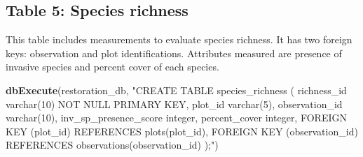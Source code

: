 \documentclass[
]{book}
\newenvironment{Shaded}{\begin{snugshade}}{\end{snugshade}}
\newcommand{\KeywordTok}[1]{\textcolor[rgb]{0.13,0.29,0.53}{\textbf{#1}}}
\newcommand{\NormalTok}[1]{#1}
\newcommand{\StringTok}[1]{\textcolor[rgb]{0.31,0.60,0.02}{#1}}
\begin{document}
\hypertarget{table-5-species-richness}{%
\subsection{Table 5: Species richness}\label{table-5-species-richness}}

This table includes measurements to evaluate species richness. It has two foreign keys: observation and plot identifications. Attributes measured are presence of invasive species and percent cover of each species.

\begin{Shaded}
\begin{Highlighting}[]
\KeywordTok{dbExecute}\NormalTok{(restoration_db, }\StringTok{"CREATE TABLE species_richness (}
\StringTok{          richness_id varchar(10) NOT NULL PRIMARY KEY,}
\StringTok{          plot_id varchar(5),}
\StringTok{          observation_id varchar(10),}
\StringTok{          inv_sp_presence_score integer, }
\StringTok{          percent_cover integer,}
\StringTok{          FOREIGN KEY (plot_id) REFERENCES plots(plot_id),}
\StringTok{          FOREIGN KEY (observation_id) REFERENCES observations(observation_id)}
\StringTok{          );"}\NormalTok{)}
\end{Highlighting}
\end{Shaded}

  
\end{document}
